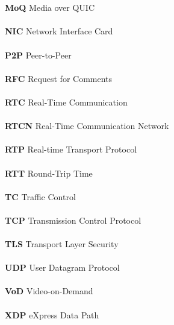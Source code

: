 \begin{tabbing}
    \\\\\textbf{MoQ} \> Media over QUIC
    \\\\\textbf{NIC} \> Network Interface Card
    \\\\\textbf{P2P} \> Peer-to-Peer
    \\\\\textbf{RFC} \> Request for Comments
    \\\\\textbf{RTC} \> Real-Time Communication
    \\\\\textbf{RTCN} \> Real-Time Communication Network
    \\\\\textbf{RTP} \> Real-time Transport Protocol
    \\\\\textbf{RTT} \> Round-Trip Time
    \\\\\textbf{TC} \> Traffic Control
    \\\\\textbf{TCP} \> Transmission Control Protocol
    \\\\\textbf{TLS} \> Transport Layer Security
    \\\\\textbf{UDP} \> User Datagram Protocol
    \\\\\textbf{VoD} \> Video-on-Demand
    \\\\\textbf{XDP} \> eXpress Data Path
\end{tabbing}


